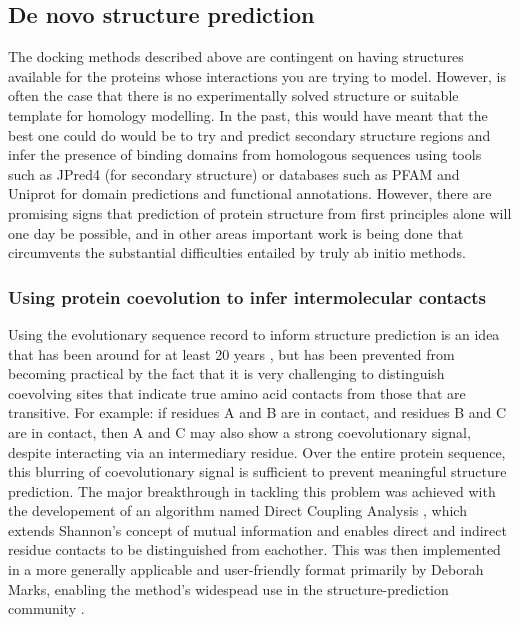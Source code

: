 \documentclass[a4paper,11pt,twoside,openright]{scrbook}
\begin{document}
\subsection{De novo structure prediction}
The docking methods described above are contingent on having structures available for the proteins whose interactions you are trying to model. However, is often the case that there is no experimentally solved structure or suitable template for homology modelling. In the past, this would have meant that the best one could do would be to try and predict secondary structure regions and infer the presence of binding domains from homologous sequences using tools such as JPred4 \cite{Drozdetskiy2015} (for secondary structure) or databases such as PFAM and Uniprot \cite{Finn2016,Consortium2017} for domain predictions and functional annotations. However, there are promising signs that prediction of protein structure from first principles alone will one day be possible, and in other areas important work is being done that circumvents the substantial difficulties entailed by truly ab initio methods.

\subsubsection{Using protein coevolution to infer intermolecular contacts}
Using the evolutionary sequence record to inform structure prediction is an idea that has been around for at least 20 years \cite{Altschuh1987}, but has been prevented from becoming practical by the fact that it is very challenging to distinguish coevolving sites that indicate true amino acid contacts from those that are transitive. For example: if residues A and B are in contact, and residues B and C are in contact, then A and C may also show a strong coevolutionary signal, despite interacting via an intermediary residue. Over the entire protein sequence, this blurring of coevolutionary signal is sufficient to prevent meaningful structure prediction. The major breakthrough in tackling this problem was achieved with the developement of an algorithm named Direct Coupling Analysis \cite{Weigt2009,Lunt2010}, which extends Shannon's concept of mutual information \cite{Shannon1948} and enables direct and indirect residue contacts to be distinguished from eachother. This was then implemented in a more generally applicable and user-friendly format primarily by Deborah Marks, enabling the method's widespead use in the structure-prediction community \cite{Marks2011,Marks2012,Hopf2014}.
\end{document}
